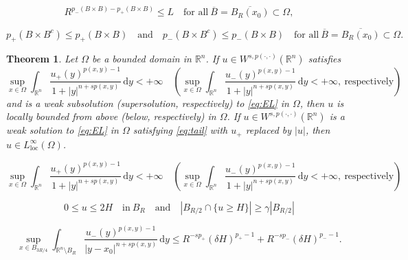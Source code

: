 \documentclass[10pt,a4paper]{amsart}
\newtheorem{theorem}{Theorem}
\begin{document}
\begin{equation} \label{eq:P1} \tag{P1}
R^{p_-(B \times B) - p_+(B \times B)} \leq L \quad \text{for all}~ \overline{B} = \overline{B_R(x_0)} \subset \Omega,
\end{equation}

\begin{equation} \label{eq:P2} \tag{P2}
p_+(B \times B^c) \leq p_+(B\times B) \quad\text{and}\quad p_-(B \times B^c) \leq p_-(B\times B) \quad\text{for all}~ \overline{B} = \overline{B_R(x_0)} \subset \Omega.
\end{equation}

\begin{theorem} \label{thm:local_boundedness}
Let $\Omega$ be a bounded domain in $\mathbb{R}^n$. If $u \in W^{s, p(\cdot,\cdot)}(\mathbb{R}^n)$ satisfies
\begin{equation} \label{eq:tail}
\sup_{x\in \Omega} \int_{\mathbb{R}^n} \frac{u_+(y)^{p(x,y)-1}}{1+|y|^{n+sp(x,y)}} \,\mathrm{d}y < +\infty \quad \left( \sup_{x\in \Omega} \int_{\mathbb{R}^n} \frac{u_-(y)^{p(x,y)-1}}{1+|y|^{n+sp(x,y)}} \,\mathrm{d}y < +\infty,~ \text{respectively} \right)
\end{equation}
and is a weak subsolution (supersolution, respectively) to \eqref{eq:EL} in $\Omega$, then $u$ is locally bounded from above (below, respectively) in $\Omega$. If $u \in W^{s, p(\cdot,\cdot)}(\mathbb{R}^n)$ is a weak solution to \eqref{eq:EL} in $\Omega$ satisfying \eqref{eq:tail} with $u_+$ replaced by $|u|$, then $u \in L^\infty_{\mathrm{loc}}(\Omega)$.
\end{theorem}

\begin{equation} 
\sup_{x\in \Omega} \int_{\mathbb{R}^n} \frac{u_+(y)^{p(x,y)-1}}{1+|y|^{n+sp(x,y)}} \,\mathrm{d}y < +\infty \quad \left( \sup_{x\in \Omega} \int_{\mathbb{R}^n} \frac{u_-(y)^{p(x,y)-1}}{1+|y|^{n+sp(x,y)}} \,\mathrm{d}y < +\infty,~ \text{respectively} \right)
\end{equation}

\begin{equation} \label{eq:assumption1}
0 \leq u \leq 2H \quad\text{in}~ B_R \quad\text{and}\quad |B_{R/2} \cap \lbrace u \geq H \rbrace| \geq \gamma |B_{R/2}|
\end{equation}

\begin{equation} \label{eq:assumption_tail2}
\sup_{x \in B_{3R/4}} \int_{\mathbb{R}^n \setminus B_R} \frac{u_-(y)^{p(x,y)-1}}{|y-x_0|^{n+sp(x,y)}} \,\mathrm{d}y \leq R^{-sp_+} (\delta H)^{p_+-1} + R^{-sp_-} (\delta H)^{p_--1}.
\end{equation}
\end{document}
